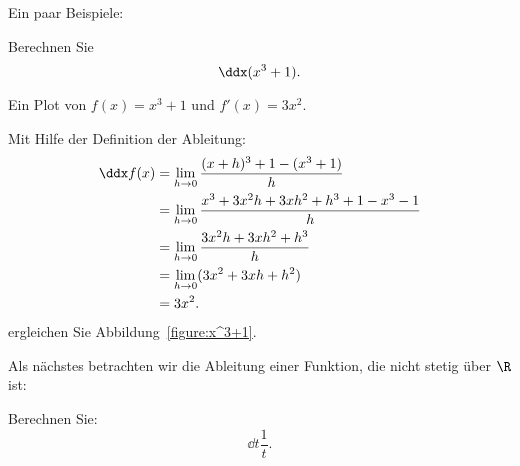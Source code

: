 Ein paar Beispiele:

\begin{example}
Berechnen Sie 
\[
\ddx (x^3 + 1).
\] 
\end{example}

\begin{marginfigure}[0in]
\caption{Ein Plot von $f(x) = x^3+1$ und $f'(x) = 3x^2$.}
\label{figure:x^3+1}
\end{marginfigure}

\begin{solution}
Mit Hilfe der Definition der Ableitung:
\begin{align*}
\ddx f(x) &= \lim_{h\to 0}\frac{(x+h)^3 + 1 - (x^3 +1)}{h}\\
&= \lim_{h\to 0}\frac{x^3+3x^2h+3xh^2 + h^3 + 1 - x^3 -1}{h}\\
&= \lim_{h\to 0}\frac{3x^2h+3xh^2 + h^3}{h}\\
&= \lim_{h\to 0}(3x^2+3xh + h^2)\\
&= 3x^2.
\end{align*}
ergleichen Sie Abbildung~\ref{figure:x^3+1}.
\end{solution}



Als nächstes betrachten wir die Ableitung einer Funktion, die nicht stetig über $\R$ ist:


\begin{example}
Berechnen Sie:
\[
\dd t \frac{1}{t}.
\]
\end{example}

